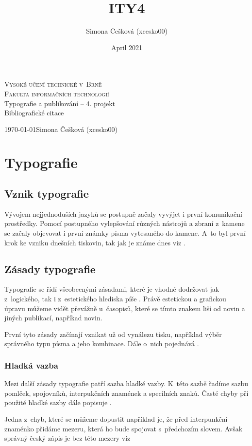 \documentclass[a4paper, 11pt]{article}
\title{ITY4}
\author{Simona Češková (xcesko00)}
\date{April 2021}
\begin{document}
\begin{titlepage}
\begin{center}
\Huge
\textsc{Vysoké učení technické v~Brně\\
\huge{Fakulta informačních technologií}} \\
\LARGE
Typografie a publikování -- 4. projekt \\
\Huge{Bibliografické citace} \\
\end{center}
{\Large \today \hfill Simona Češková (xcesko00)}
\end{titlepage}

\section{Typografie}
\subsection{Vznik typografie}
Vývojem nejjednoduších jazyků se postupně začaly vyvýjet i první komunikační prostředky. Pomocí postupného vylepšování různých nástrojů a zbraní z~kamene se začaly objevovat i první známky písma vytesaného do kamene. A~to byl první krok ke vzniku dnešních tiskovin, tak jak je známe dnes viz \cite{Hamilton2009}.

\subsection{Zásady typografie}
Typografie se řídí všeobecnými zásadami, které je vhodné dodržovat jak z~logického, tak i z~estetického hlediska píše \cite{Sirucek2006}. Právě estetickou a grafickou úpravu můžeme vidět převážně u~časopisů, které se tímto znakem liší od novin a jiných publikací, napříkad novin. \cite{Bartos2017}

\par
První tyto zásady začínají vznikat už od vynálezu tisku, například výběr správného typu písma a jeho kombinace. Dále o~nich pojednává \cite{Sirucek2006}.

\subsubsection{Hladká vazba}
Mezi další zásady typografie patří sazba hladké vazby. K~této sazbě řadíme sazbu pomlček, spojovníků, interpukčních znamének a specilních znaků. Časté chyby při použité hladké sazby dále popisuje \cite{Glac2006}.
\par
Jedna z~chyb, které se můžeme dopustit například je, že před interpunkční znaménko přidáme mezeru, která ho bude spojovat s~předchozím slovem. Avšak správný český zápis je bez této mezery viz \cite{Cmejrkova1999}
\end{document}
